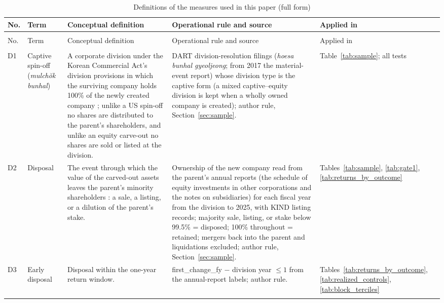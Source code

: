 \begin{longtable}{>{\raggedright\arraybackslash}p{0.7cm}>{\raggedright\arraybackslash}p{2.4cm}>{\raggedright\arraybackslash}p{3.5cm}>{\raggedright\arraybackslash}p{4.8cm}>{\raggedright\arraybackslash}p{2.1cm}}
\caption{Definitions of the measures used in this paper (full form)}\label{tab:s_defs_full}\\
\toprule No. & Term & Conceptual definition & Operational rule and source & Applied in \\ \midrule \endfirsthead
\multicolumn{5}{l}{\small Table~\thetable\ (continued)}\\ \toprule No. & Term & Conceptual definition & Operational rule and source & Applied in \\ \midrule \endhead
\midrule\multicolumn{5}{r}{\small continued on next page}\\ \endfoot
\bottomrule \endlastfoot
D1 & Captive spin-off (\emph{mulchŏk bunhal}) & A corporate division under the Korean Commercial Act's division provisions in which the surviving company holds 100\% of the newly created company \protect\cite{kang2025}; unlike a US spin-off no shares are distributed to the parent's shareholders, and unlike an equity carve-out no shares are sold or listed at the division. & DART division-resolution filings (\emph{hoesa bunhal gyeoljeong}; from 2017 the material-event report) whose division type is the captive form (a mixed captive--equity division is kept when a wholly owned company is created); author rule, Section~\ref{sec:sample}. & Table~\ref{tab:sample}; all tests \\ \addlinespace[2pt]
D2 & Disposal & The event through which the value of the carved-out assets leaves the parent's minority shareholders \protect\cite{kang2025}: a sale, a listing, or a dilution of the parent's stake. & Ownership of the new company read from the parent's annual reports (the schedule of equity investments in other corporations and the notes on subsidiaries) for each fiscal year from the division to 2025, with KIND listing records; majority sale, listing, or stake below 99.5\% = disposed; 100\% throughout = retained; mergers back into the parent and liquidations excluded; author rule, Section~\ref{sec:sample}. & Tables~\ref{tab:sample}, \ref{tab:gate1}, \ref{tab:returns_by_outcome} \\ \addlinespace[2pt]
D3 & Early disposal & Disposal within the one-year return window. & first\_change\_fy $-$ division year $\le 1$ from the annual-report labels; author rule. & Tables~\ref{tab:returns_by_outcome}, \ref{tab:realized_controls}, \ref{tab:block_terciles} \\ \addlinespace[2pt]

\end{longtable}
